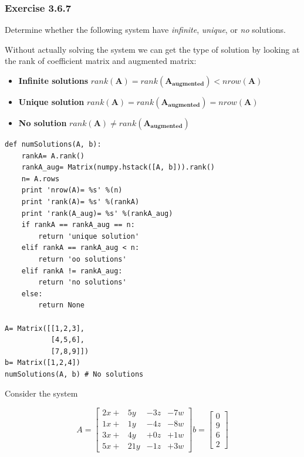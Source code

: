 \subsubsection{Exercise 3.6.7}

Determine whether the following system have \emph{infinite}, \emph{unique}, or
\emph{no} solutions.

Without actually solving the system we can get the type of solution by looking
at the rank of coefficient matrix and augmented matrix:

\begin{itemize}
\item \textbf{Infinite solutions} $rank(\mathbf{A}) = rank(\mathbf{A_{augmented}}) < nrow(\mathbf{A})$
\item \textbf{Unique solution} $rank(\mathbf{A}) = rank(\mathbf{A_{augmented}}) = nrow(\mathbf{A})$
\item \textbf{No solution} $rank(\mathbf{A}) \neq rank(\mathbf{A_{augmented}})$
\end{itemize}


\begin{verbatim}
def numSolutions(A, b):
    rankA= A.rank()
    rankA_aug= Matrix(numpy.hstack([A, b])).rank()
    n= A.rows
    print 'nrow(A)= %s' %(n)
    print 'rank(A)= %s' %(rankA)
    print 'rank(A_aug)= %s' %(rankA_aug)
    if rankA == rankA_aug == n:
        return 'unique solution'
    elif rankA == rankA_aug < n:
        return 'oo solutions'
    elif rankA != rankA_aug:
        return 'no solutions'
    else:
        return None

A= Matrix([[1,2,3],
           [4,5,6],
           [7,8,9]])
b= Matrix([1,2,4])
numSolutions(A, b) # No solutions
\end{verbatim}

Consider the system

$$
A = \left[\begin{matrix}2x +& 5y & -3z & -7w\\
                        1x +& 1y & -4z & -8w\\
                        3x +& 4y & + 0z  & +1w \\
                        5x +& 21y & -1z & +3w
        \end{matrix}\right]
b= \left[\begin{matrix}0\\9\\6\\2\end{matrix}\right]
$$


